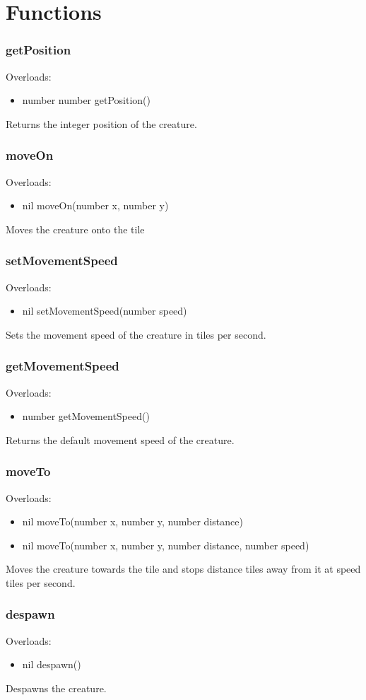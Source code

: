 \documentclass{book}
\newenvironment{ulist}
	{\begin{itemize}
			\itemsep0em}
	{\end{itemize}}
\begin{document}
\section{Functions}
\subsubsection{getPosition}
Overloads:
\begin{ulist}
	\item number number getPosition()
\end{ulist}
Returns the integer position of the creature.

\subsubsection{moveOn}
Overloads:
\begin{ulist}
	\item nil moveOn(number x, number y)
\end{ulist}
Moves the creature onto the tile

\subsubsection{setMovementSpeed}
Overloads:
\begin{ulist}
	\item nil setMovementSpeed(number speed)
\end{ulist}
Sets the movement speed of the creature in tiles per second.

\subsubsection{getMovementSpeed}
Overloads:
\begin{ulist}
	\item number getMovementSpeed()
\end{ulist}
Returns the default movement speed of the creature.

\subsubsection{moveTo}
Overloads:
\begin{ulist}
	\item nil moveTo(number x, number y, number distance)
	\item nil moveTo(number x, number y, number distance, number speed)
\end{ulist}
Moves the creature towards the tile and stops distance tiles away from it at speed tiles per second.

\subsubsection{despawn}
Overloads:
\begin{ulist}
	\item nil despawn()
\end{ulist}
Despawns the creature.
\end{document}
